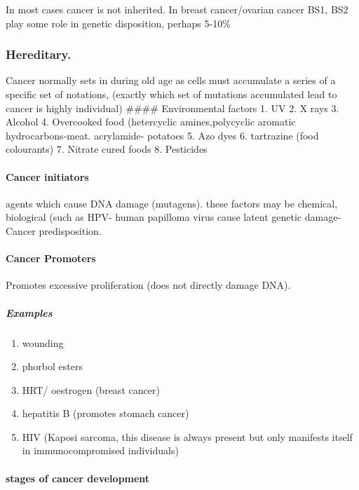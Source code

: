 \documentclass[]{article}
\providecommand{\tightlist}{%
  \setlength{\itemsep}{0pt}\setlength{\parskip}{0pt}}
\let\oldparagraph\paragraph
\renewcommand{\paragraph}[1]{\oldparagraph{#1}\mbox{}}
\let\oldsubparagraph\subparagraph
\renewcommand{\subparagraph}[1]{\oldsubparagraph{#1}\mbox{}}
\begin{document}
In most cases cancer is not inherited. In breast cancer/ovarian cancer
BS1, BS2 play some role in genetic disposition, perhaps 5-10\%

\hypertarget{hereditary.-1}{%
\subsubsection{Hereditary.}\label{hereditary.-1}}

Cancer normally sets in during old age as cells must accumulate a series
of a specific set of notations, (exactly which set of mutations
accumulated lead to cancer is highly individual) \#\#\#\# Environmental
factors 1. UV 2. X rays 3. Alcohol 4. Overcooked food (hetercyclic
amines,polycyclic aromatic hydrocarbons-meat. acrylamide- potatoes 5.
Azo dyes 6. tartrazine (food colourants) 7. Nitrate cured foods 8.
Pesticides

\hypertarget{cancer-initiators-1}{%
\paragraph{Cancer initiators}\label{cancer-initiators-1}}

agents which cause DNA damage (mutagens). these factors may be chemical,
biological (such as HPV- human papilloma virus cause latent genetic
damage- Cancer predisposition.

\hypertarget{cancer-promoters-1}{%
\paragraph{Cancer Promoters}\label{cancer-promoters-1}}

Promotes excessive proliferation (does not directly damage DNA).

\hypertarget{examples-5}{%
\subparagraph{Examples}\label{examples-5}}

\begin{enumerate}
\def\labelenumi{\arabic{enumi}.}
\tightlist
\item
  wounding
\item
  phorbol esters
\item
  HRT/ oestrogen (breast cancer)
\item
  hepatitis B (promotes stomach cancer)
\item
  HIV (Kaposi sarcoma, this disease is always present but only manifests
  itself in immunocompromised individuals)
\end{enumerate}

\hypertarget{stages-of-cancer-development-1}{%
\paragraph{stages of cancer
development}\label{stages-of-cancer-development-1}}
\end{document}
